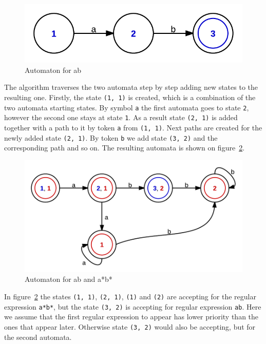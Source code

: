 \begin{description}
\begin{figure}[h]
  \centering
    \includegraphics{automaton_1}
  \caption{Automaton for ab}
  \label{fig:automaton_ab}
\end{figure}


The algorithm traverses the two automata step by step adding new states to the
resulting one. Firstly, the state \verb/(1, 1)/ is created, which is a
combination of the two automata starting states. By symbol \verb/a/ the first
automata goes to state \verb/2/, however the second one stays at state
\verb/1/. As a result state \verb/(2, 1)/ is added together with a path to it
by token \verb/a/ from \verb/(1, 1)/. Next paths are created for the newly
added state \verb/(2, 1)/. By token \verb/b/ we add state \verb/(3, 2)/ and the
corresponding path and so on. The resulting automata is shown on
figure~\ref{fig:automata_merge}. 

\begin{figure}[h]
    \centering
    \includegraphics{automata_merge}
  \caption{Automaton for ab and a*b*}
  \label{fig:automata_merge}
\end{figure}

In figure~\ref{fig:automata_merge} the states \verb/(1, 1)/, \verb/(2, 1)/, \verb/(1)/ and \verb/(2)/ are accepting for the regular expression \verb/a*b*/, but the state \verb/(3, 2)/ is accepting for regular expression \verb/ab/. Here we assume that the first regular expression to appear has lower priority than the ones that appear later. Otherwise state \verb/(3, 2)/ would also be accepting, but for the second automata.


\end{description}
